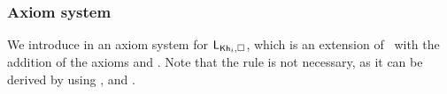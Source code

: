 \subsubsection{Axiom system}

We introduce in  an axiom system for $\mathsf{L}_{{\sf Kh}_i,\square}$, which is an extension of~ with the addition of the axioms  and .
Note that the rule  is not necessary, as it can be derived by using ,  and .









